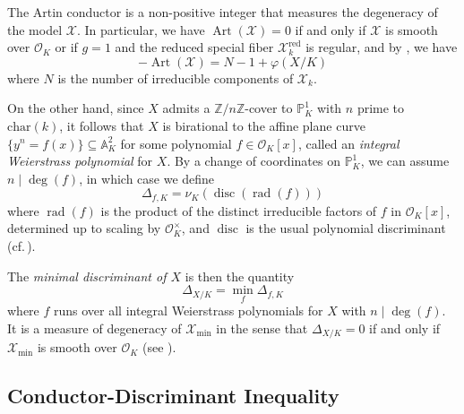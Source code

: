 \documentclass[12pt]{amsart}
\numberwithin{equation}{section}
\theoremstyle{definition}
\newcommand{\Z}{\mathbb Z}
\renewcommand{\O}{\mathcal{O}}
\newcommand{\A}{\mathbb A}
\renewcommand{\P}{\mathbb P}
\renewcommand{\phi}{\varphi}
\newcommand{\X}{\mathcal{X}}
\newcommand{\tx}[1]{\text{#1}}
\DeclareMathOperator{\disc}{disc}
\DeclareMathOperator{\Art}{Art}
\DeclareMathOperator{\Proj}{Proj}
\DeclareMathOperator{\rad}{rad}
\begin{document}
The Artin conductor is a non-positive integer that measures the degeneracy of the model $\X$. In particular, we have $\Art(\X)=0$ if and only if $\X$ is smooth over $\O_K$ or if $g=1$ and the reduced special fiber $\X_k^\tx{red}$ is regular, and by \cite[Proposition 1]{Liu_conductor}, we have
    \begin{equation}\label{eq: Liu equation}
        -\Art(\X)=N-1+\phi(X/K)
    \end{equation}
where $N$ is the number of irreducible components of $\X_k$.%

On the other hand, since $X$ admits a $\Z/n\Z$-cover to $\P^1_K$ with $n$ prime to $\tx{char}(k)$, it follows that $X$ is birational to the affine plane curve $\{y^n=f(x)\}\subseteq\A^2_K$ for some polynomial $f\in\O_K[x]$, called an \textit{integral Weierstrass polynomial} for $X$. By a change of coordinates on $\P^1_K$, we can assume $n\mid\deg(f)$, in which case we define
\[\Delta_{f,K}=\nu_K(\disc(\rad(f)))\] where $\rad(f)$ is the product of the distinct irreducible factors of $f$ in $\O_K[x]$, determined up to scaling by $\O_K^\times$, and $\disc$ is the usual polynomial discriminant (cf.\,\cite[Definition 1.1]{Part1}).



The \textit{minimal discriminant of $X$} is then the quantity
\[\Delta_{X/K}=\min_f\Delta_{f,K}\]
where $f$ runs over all integral Weierstrass polynomials for $X$ with $n\mid\deg(f)$. It is a measure of degeneracy of $\X_{\min}$ in the sense that $\Delta_{X/K}=0$ if and only if $\X_{\min}$ is smooth over $\O_K$ (see \cite[Lemma 2.1(ii) and Proposition 2.4]{Part1}).



\subsection{Conductor-Discriminant Inequality}\label{subsection 1.2}\hfill
\end{document}

